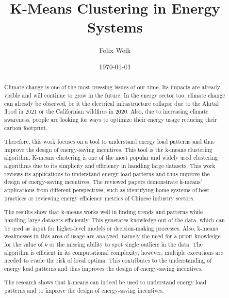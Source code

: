 \documentclass{revtex4-2}
\begin{document}
\title{K-Means Clustering in Energy Systems}
\author{Felix Weik}
\date{\today}


\begin{abstract}
Climate change is one of the most pressing issues of our time. 
Its impacts are already visible and will continue to grow in the future.
In the energy sector too, climate change can already be observed, be it the electrical infrastructure collapse due to the Ahrtal flood in 2021 or the Californian wildfires in 2020.
Also, due to increasing climate awareness, people are looking for ways to optimize their energy usage reducing their carbon footprint.

Therefore, this work focuses on a tool to understand energy load patterns and thus improve the design of energy-saving incentives.
This tool is the k-means clustering algorithm.
K-means clustering is one of the most popular and widely used clustering algorithms due to its simplicity and efficiency in handling large datasets.
This work reviews its applications to understand energy load patterns and thus improve the design of energy-saving incentives.
The reviewed papers demonstrate k-means' applications from different perspectives, such as identifying home systems of best practices or reviewing energy efficiency metrics of Chinese industry sectors.

The results show that k-means works well in finding trends and patterns while handling large datasets efficiently.
This generates knowledge out of the data, which can be used as input for higher-level models or decision-making processes.
Also, k-means weaknesses in this area of usage are analyzed, namely the need for a priori knowledge for the value of $k$ or the missing ability to spot single outliers in the data.
The algorithm is efficient in its computational complexity, however, multiple executions are needed to evade the risk of local optima.
This contributes to the understanding of energy load patterns and thus improves the design of energy-saving incentives.

The research shows that k-means can indeed be used to understand energy load patterns and to improve the design of energy-saving incentives.
\end{abstract}
\end{document}
